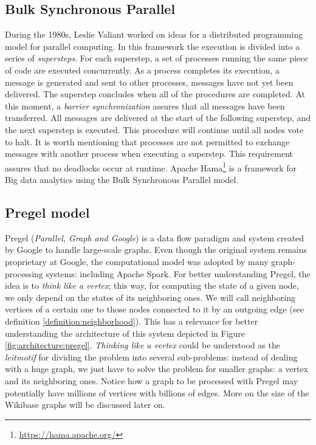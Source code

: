 \subsection{Bulk Synchronous Parallel}

During the 1980s, Leslie Valiant worked on ideas for a distributed programming model for parallel computing. In this framework the execution is divided into a series of \textit{supersteps}. For each superstep, a set of processes running the same piece of code are executed concurrently. As a process completes its execution, a message is generated and sent to other processes, messages have not yet been delivered. The superstep concludes when all of the procedures are completed. At this moment, a \textit{barrier synchronization} assures that all messages have been transferred. All messages are delivered at the start of the following superstep, and the next superstep is executed. This procedure will continue until all nodes vote to halt. It is worth mentioning that processes are not permitted to exchange messages with another process when executing a superstep. This requirement assures that no deadlocks occur at runtime. Apache Hama\footnote{\url{https://hama.apache.org/}} is a framework for Big data analytics using the Bulk Synchronous Parallel model.

\subsection{Pregel model}
\label{section:pregel}

Pregel (\textit{Parallel, Graph and Google}) is a data flow paradigm and system created by Google to handle large-scale graphs. Even though the original system remains proprietary at Google, the computational model was adopted by many graph-processing systems: including Apache Spark. For better understanding Pregel, the idea is to \textit{think like a vertex}; this way, for computing the state of a given node, we only depend on the states of its neighboring ones. We will call neighboring vertices of a certain one to those nodes connected to it by an outgoing edge (see definition \ref{definition:neighborhood}). This has a relevance for better understanding the architecture of this system depicted in Figure \ref{fig:architecture:pregel}. \textit{Thinking like a vertex} could be understood as the \textit{leitmotif} for dividing the problem into several sub-problems: instead of dealing with a huge graph, we just have to solve the problem for smaller graphs: a vertex and its neighboring ones. Notice how a graph to be processed with Pregel may potentially have millions of vertices with billions of edges. More on the size of the Wikibase graphs will be discussed later on.

